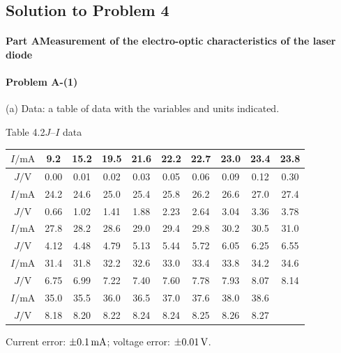 \subsection*{Solution to Problem 4}

\paragraph{Part A\quad Measurement of the electro-optic characteristics of the laser diode}

\paragraph{Problem A-(1)}

(a) Data: a table of data with the variables and units indicated.

\begin{center}
{\small Table 4.2\quad $J$--$I$ data}\\[3pt]
{\small
\renewcommand{\arraystretch}{1.15}
\begin{tabular}{|c|c|c|c|c|c|c|c|c|c|}
\hline
$I/\mathrm{mA}$ & 9.2 & 15.2 & 19.5 & 21.6 & 22.2 & 22.7 & 23.0 & 23.4 & 23.8\\
\hline
$J/\mathrm{V}$ & 0.00 & 0.01 & 0.02 & 0.03 & 0.05 & 0.06 & 0.09 & 0.12 & 0.30\\
\hline\hline
$I/\mathrm{mA}$ & 24.2 & 24.6 & 25.0 & 25.4 & 25.8 & 26.2 & 26.6 & 27.0 & 27.4\\
\hline
$J/\mathrm{V}$ & 0.66 & 1.02 & 1.41 & 1.88 & 2.23 & 2.64 & 3.04 & 3.36 & 3.78\\
\hline\hline
$I/\mathrm{mA}$ & 27.8 & 28.2 & 28.6 & 29.0 & 29.4 & 29.8 & 30.2 & 30.5 & 31.0\\
\hline
$J/\mathrm{V}$ & 4.12 & 4.48 & 4.79 & 5.13 & 5.44 & 5.72 & 6.05 & 6.25 & 6.55\\
\hline\hline
$I/\mathrm{mA}$ & 31.4 & 31.8 & 32.2 & 32.6 & 33.0 & 33.4 & 33.8 & 34.2 & 34.6\\
\hline
$J/\mathrm{V}$ & 6.75 & 6.99 & 7.22 & 7.40 & 7.60 & 7.78 & 7.93 & 8.07 & 8.14\\
\hline\hline
$I/\mathrm{mA}$ & 35.0 & 35.5 & 36.0 & 36.5 & 37.0 & 37.6 & 38.0 & 38.6 & \\
\hline
$J/\mathrm{V}$ & 8.18 & 8.20 & 8.22 & 8.24 & 8.24 & 8.25 & 8.26 & 8.27 & \\
\hline
\end{tabular}}
\end{center}

Current error: $\pm0.1\,\mathrm{mA}$; voltage error: $\pm0.01\,\mathrm{V}$.

